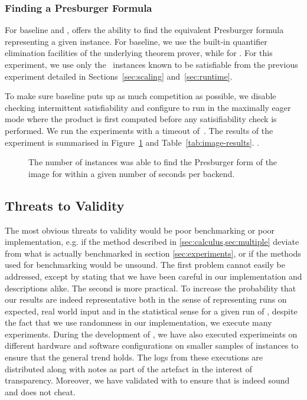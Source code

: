 \documentclass[acmsmall,review,anonymous,screen]{acmart}\settopmatter{printfolios=true,printccs=false,printacmref=true}
\theoremstyle{definition}
\begin{document}
\subsubsection{Finding a Presburger Formula}\label{sec:evaluation:finding-image}

For baseline and \Calculus{}, \Catra{} offers the ability to find the equivalent Presburger formula representing a given instance. For baseline, we use the built-in quantifier elimination facilities of the underlying \Princess{} theorem prover, while for \Catra{} . For this experiment, we use only the~\NrKnownSat{} instances known to be satisfiable from the previous experiment detailed in Sections~\ref{sec:scaling} and~\ref{sec:runtime}. 

To make sure baseline puts up as much competition as possible, we disable
checking intermittent satisfiability and configure \Catra{} to run in the
maximally eager mode where the product is first computed before any
satisifiability check is performed. We run the experiments with a timeout of~\ImageTimeout{}. The results of the experiment is summarised
in Figure~\ref{fig:cactus:image} and Table~\ref{tab:image-results}. .

\begin{figure}
  \caption{The number of instances \Catra{} was able to find the Presburger form of the image for within a given number of seconds per backend.}
  \label{fig:cactus:image}
\end{figure}


\subsection{Threats to Validity}

The most obvious threats to validity would be poor benchmarking or poor
implementation, e.g. if the method described in \cref{sec:calculus,sec:multiple}
deviate from what is actually benchmarked in section \cref{sec:experiments}, or
if the methods used for benchmarking would be unsound. The first problem cannot
easily be addressed, except by stating that we have been careful in our
implementation and descriptions alike. The second is more practical. To increase
the probability that our results are indeed representative both in the sense of
representing runs on expected, real world input and in the statistical sense for
a given run of \Catra, despite the fact that we use randomness in our
implementation, we execute many experiments. During the development of \Catra{},
we have also executed experimeints on different hardware and software
configurations on smaller samples of instances to ensure that the general trend
holds. The logs from these executions are distributed along with notes as part
of the artefact in the interest of transparency. Moreover, we have validated
 with \Nuxmv{} to
ensure that \Calculus{} is indeed sound and does not cheat.
\end{document}
